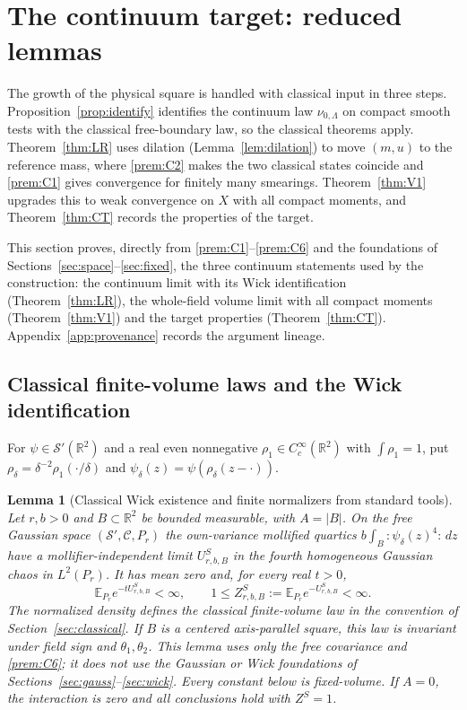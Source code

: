 \documentclass[11pt]{article}
\theoremstyle{plain}
\newtheorem{lemma}[theorem]{Lemma}
\theoremstyle{definition}
\theoremstyle{remark}
\newcommand{\R}{\mathbb{R}}
\newcommand{\E}{\mathbb{E}}
\newcommand{\cC}{\mathcal{C}}
\newcommand{\cS}{\mathcal{S}}
\begin{document}
\section{The continuum target: reduced lemmas}\label{sec:target}

The growth of the physical square is handled with classical input in three steps. Proposition~\ref{prop:identify} identifies the continuum law $\nu_{0,\Lambda}$ on compact smooth tests with the classical free-boundary law, so the classical theorems apply. Theorem~\ref{thm:LR} uses dilation (Lemma~\ref{lem:dilation}) to move $(m,u)$ to the reference mass, where \ref{prem:C2} makes the two classical states coincide and \ref{prem:C1} gives convergence for finitely many smearings. Theorem~\ref{thm:V1} upgrades this to weak convergence on $X$ with all compact moments, and Theorem~\ref{thm:CT} records the properties of the target.

This section proves, directly from \ref{prem:C1}--\ref{prem:C6} and the
foundations of Sections~\ref{sec:space}--\ref{sec:fixed}, the three continuum
statements used by the construction: the continuum limit with its Wick
identification (Theorem~\ref{thm:LR}), the whole-field volume limit with all
compact moments (Theorem~\ref{thm:V1}) and the target properties
(Theorem~\ref{thm:CT}). Appendix~\ref{app:provenance} records the argument lineage.

\subsection{Classical finite-volume laws and the Wick identification}\label{sec:LR}

For $\psi\in\cS'(\R^{2})$ and a real even nonnegative $\rho_1\in C_c^{\infty}(\R^{2})$ with
$\int\rho_1=1$, put $\rho_\delta=\delta^{-2}\rho_1(\cdot/\delta)$ and
$\psi_\delta(z)=\psi(\rho_\delta(z-\cdot))$.

\begin{lemma}[Classical Wick existence and finite normalizers from standard tools]
\label{lem:classical-wick}
Let $r,b>0$ and $B\subset\R^2$ be bounded measurable, with $A=|B|$.
On the free Gaussian space $(\cS',\cC,P_r)$ the own-variance mollified
quartics $b\int_B{:}\psi_\delta(z)^4{:}\,dz$ have a mollifier-independent
limit $U^S_{r,b,B}$ in the fourth homogeneous Gaussian chaos in $L^2(P_r)$.
It has mean zero and, for every real $t>0$,
\[
 \E_{P_r}e^{-tU^S_{r,b,B}}<\infty,\qquad
 1\le Z^S_{r,b,B}:=\E_{P_r}e^{-U^S_{r,b,B}}<\infty.
\]
The normalized density defines the classical finite-volume law in the
convention of Section~\ref{sec:classical}. If $B$ is a centered axis-parallel
square, this law is invariant under field sign and $\theta_1,\theta_2$.
This lemma uses only the free covariance and \ref{prem:C6}; it does not use
the Gaussian or Wick foundations of Sections~\ref{sec:gauss}--\ref{sec:wick}.
Every constant below is fixed-volume. If $A=0$, the interaction is zero and
all conclusions hold with $Z^S=1$.
\end{lemma}
\end{document}
